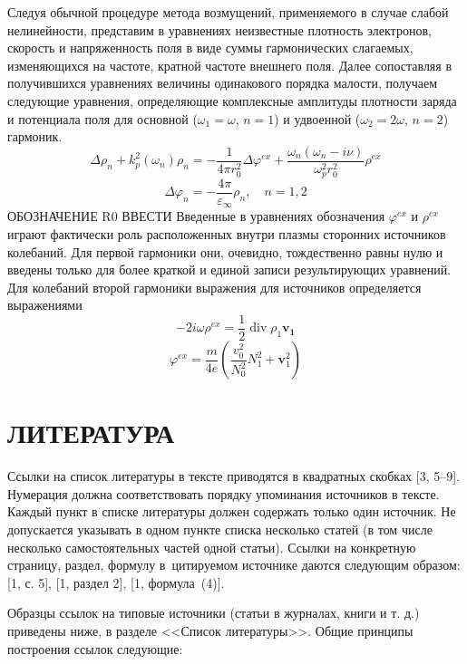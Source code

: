 \documentclass[12pt, a4paper]{article}
\renewcommand{\vec}{\mathbf}
\def \eps {\varepsilon}
\def \w {\omega}
\def \ph {\varphi}
\begin{document}
Следуя обычной процедуре метода возмущений, применяемого в случае слабой нелинейности, представим в уравнениях неизвестные плотность электронов, скорость и напряженность поля в виде суммы гармонических слагаемых, изменяющихся на частоте, кратной частоте внешнего поля. Далее сопоставляя в получившихся уравнениях величины одинакового порядка малости, получаем следующие уравнения, определяющие комплексные амплитуды плотности заряда и потенциала поля для основной ($\w_1=\w$, $n=1$) и удвоенной ($\w_2=2\w$, $n=2$) гармоник.
\begin{equation} 
 \Delta \rho_n + k_p^2(\w_n)\rho_n = -\frac{1}{4 \pi r_0^2} \Delta \ph^{ex} + \frac{\w_n(\w_n - i \nu)}{\w_p^2r_0^2} \rho^{ex}
\end{equation}
\begin{equation} 
 \Delta \ph_n = - \frac{4 \pi}{\eps_\infty} \rho_n, \quad n = 1,2 
\end{equation}
ОБОЗНАЧЕНИЕ R0 ВВЕСТИ
Введенные в уравнениях обозначения $\ph^{ex}$ и $\rho^{ex}$ играют фактически роль расположенных внутри плазмы сторонних источников колебаний. Для первой гармоники они, очевидно, тождественно равны нулю и введены только для более краткой и единой записи результирующих уравнений. Для колебаний второй гармоники выражения для источников определяется выражениями 
\begin{equation}
 - 2i\w \rho^{ex} = \frac{1}{2}\operatorname{div} \rho_1 \vec{v_1}
\end{equation}
\begin{equation}
\ph^{ex} = \frac{m}{4e}(\frac{v_0^2}{N_0^2}N_1^2 + \vec{v}_1^2)
\end{equation}

\section{ЛИТЕРАТУРА}

Ссылки на список литературы в тексте приводятся в квадратных скобках [3, 5--9]. Нумерация должна соответствовать порядку упоминания источников в тексте. Каждый пункт в списке литературы должен содержать только один источник. Не допускается указывать в одном пункте списка несколько статей (в том числе несколько самостоятельных частей одной статьи). Ссылки на конкретную страницу, раздел, формулу в~цитируемом источнике даются следующим образом: [1, с. 5], [1, раздел 2], [1, формула~(4)].

Образцы ссылок на типовые источники (статьи в журналах, книги и т. д.) приведены ниже, в разделе <<Список литературы>>. Общие принципы построения ссылок следующие:
\end{document}
